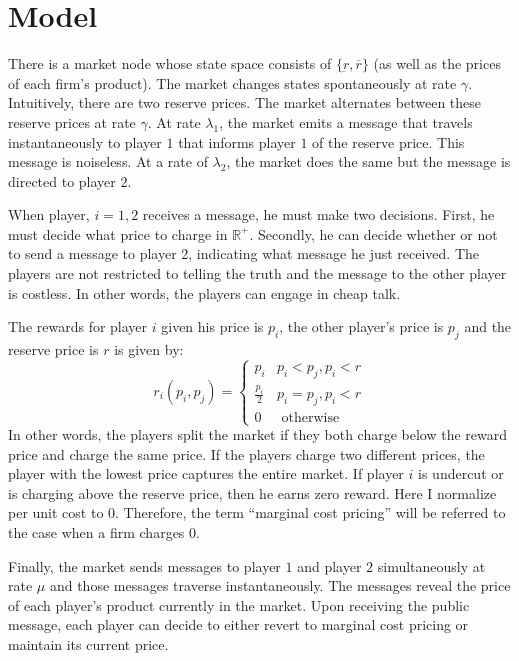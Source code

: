 \documentclass{article}
\begin{document}

\section{Model}
 There is a market node whose state space consists of $\{\underbar{r},
\overline{r}\}$ (as well as the prices of each firm's product).  The market
changes states spontaneously at rate $\gamma$. 
Intuitively, there are two reserve prices.  The market alternates
between these reserve prices at rate $\gamma$.  At rate $\lambda_1$,
the market emits a message that travels instantaneously to player
$1$ that informs player $1$ of the reserve price.  This message is
noiseless.  At a rate of $\lambda_2$, the market does the same but the
message is directed to player $2$.

When player, $i=1,2$ receives a message, he must make two decisions.  First,
he must decide what price to charge in $\mathbb{R}^+$.  Secondly, he
can decide whether or not to send a message to player $2$, indicating
what message he just received.  The players are not restricted to
telling the truth and the message to the other player is costless.  In
other words, the players can engage in cheap talk.

The rewards for player $i$ given his price is $p_i$, the other
player's price is $p_j$ and the reserve price is $r$ is given by:
\begin{equation}
    r_i(p_i, p_j) =  \begin{cases} 
      p_i & p_i<p_j, p_i<r \\
      \frac{p_i}{2} & p_i=p_j, p_i<r \\
      0 & \text{ otherwise }
    \end{cases}
\label{eq:rewards}
\end{equation}
In other words, the players split the market if they both charge below
the reward price and charge the same price.  If the players charge two
different prices, the player with the lowest price captures the entire
market.  If player $i$ is undercut or is charging above the reserve
price, then he earns zero reward.  Here I normalize per unit cost to
$0$.  Therefore, the term ``marginal cost pricing'' will be referred
to the case when a firm charges $0$.  

Finally, the market sends messages to player $1$ and player $2$
simultaneously at rate $\mu$ and those messages traverse
instantaneously.  The messages reveal the price of each player's
product currently in the market.  Upon receiving the public message,
each player can decide to either revert to marginal cost pricing or
maintain its current price.
\end{document}
